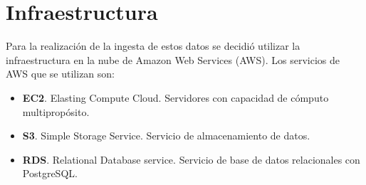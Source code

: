 \chapter{Infraestructura}
Para la realización de la ingesta de estos datos se decidió utilizar la infraestructura en la nube de Amazon Web Services (AWS). Los servicios de AWS que se utilizan son:
\begin{itemize}
    \item \textbf{EC2}. Elasting Compute Cloud. Servidores con capacidad de cómputo multipropósito.
    \item \textbf{S3}. Simple Storage Service. Servicio de almacenamiento de datos.
    \item \textbf{RDS}. Relational Database service. Servicio de base de datos relacionales con PostgreSQL.
\end{itemize}
